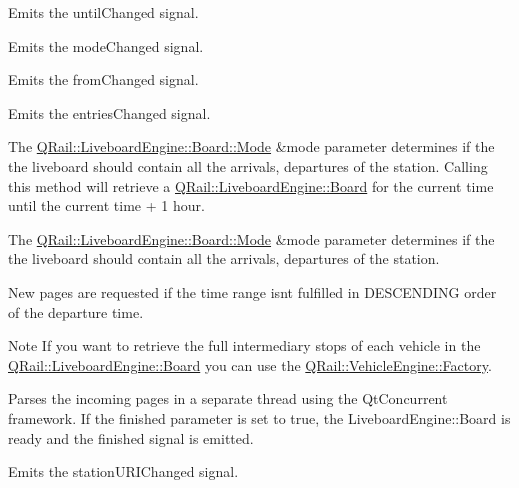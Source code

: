 Emits the until\+Changed signal.

Emits the mode\+Changed signal.

Emits the from\+Changed signal.

Emits the entries\+Changed signal.

The \mbox{\hyperlink{classQRail_1_1LiveboardEngine_1_1Board_a0ab6d318f405895f62c6e98cb2d86c6e}{Q\+Rail\+::\+Liveboard\+Engine\+::\+Board\+::\+Mode}} \&mode parameter determines if the the liveboard should contain all the arrivals, departures of the station. Calling this method will retrieve a \mbox{\hyperlink{classQRail_1_1LiveboardEngine_1_1Board}{Q\+Rail\+::\+Liveboard\+Engine\+::\+Board}} for the current time until the current time + 1 hour.

The \mbox{\hyperlink{classQRail_1_1LiveboardEngine_1_1Board_a0ab6d318f405895f62c6e98cb2d86c6e}{Q\+Rail\+::\+Liveboard\+Engine\+::\+Board\+::\+Mode}} \&mode parameter determines if the the liveboard should contain all the arrivals, departures of the station.

New pages are requested if the time range isn\textquotesingle{}t fulfilled in D\+E\+S\+C\+E\+N\+D\+I\+NG order of the departure time.

\begin{DoxyNote}{Note}
If you want to retrieve the full intermediary stops of each vehicle in the \mbox{\hyperlink{classQRail_1_1LiveboardEngine_1_1Board}{Q\+Rail\+::\+Liveboard\+Engine\+::\+Board}} you can use the \mbox{\hyperlink{classQRail_1_1VehicleEngine_1_1Factory}{Q\+Rail\+::\+Vehicle\+Engine\+::\+Factory}}.
\end{DoxyNote}
Parses the incoming pages in a separate thread using the Qt\+Concurrent framework. If the finished parameter is set to true, the Liveboard\+Engine\+::\+Board is ready and the finished signal is emitted.

Emits the station\+U\+R\+I\+Changed signal. 
